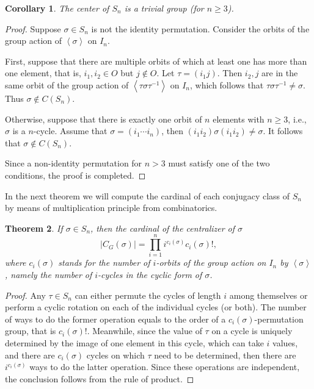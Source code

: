 \documentclass{assignment}[2019/10/15]
\newcommand{\lr}[3]{\left#1#3\right#2}
\theoremstyle{plain}
\newtheorem{theorem}{Theorem}[section]
\newtheorem{corollary}[theorem]{Corollary}
\numberwithin{equation}{section}
\begin{document}
    \begin{corollary}
        The center of $S_n$ is a trivial group (for $n \geq 3$).
    \end{corollary}

    \begin{proof}
        Suppose $\sigma\in S_n$ is not the identity permutation. Consider the orbits of the group action of $\lr<>\sigma$ on $I_n$.

        First, suppose that there are multiple orbits of which at least one has more than one element, that is, $i_1, i_2\in O$ but $j\notin O$. Let $\tau = (i_1 j)$. Then $i_2, j$ are in the same orbit of the group action of $\lr<>{\tau\sigma\tau^{-1}}$ on $I_n$, which follows that $\tau\sigma\tau^{-1}\neq\sigma$. Thus $\sigma\notin C(S_n)$.

        Otherwise, suppose that there is exactly one orbit of $n$ elements with $n\geq 3$, i.e., $\sigma$ is a $n$-cycle. Assume that $\sigma=(i_1\dotsb i_n)$, then $(i_1i_2)\sigma(i_1i_2)\neq \sigma$. It follows that $\sigma\notin C(S_n)$.

        Since a non-identity permutation for $n>3$ must satisfy one of the two conditions, the proof is completed.
    \end{proof}

    In the next theorem we will compute the cardinal of each conjugacy class of $S_n$ by means of multiplication principle from combinatorics.

    \begin{theorem}
        If $\sigma\in S_n$, then the cardinal of the centralizer of $\sigma$
        \begin{equation}
            |C_G(\sigma)| = \prod_{i=1}^ni^{c_i(\sigma)}c_i(\sigma)!,
        \end{equation}
        where $c_i(\sigma)$ stands for the number of $i$-orbits of the group action on $I_n$ by $\lr<>\sigma$, namely the number of $i$-cycles in the cyclic form of $\sigma$.
    \end{theorem}

    \begin{proof}
        Any $\tau\in S_n$ can either permute the cycles of length $i$ among themselves or perform a cyclic rotation on each of the individual cycles (or both). The number of ways to do the former operation equals to the order of a $c_i(\sigma)$-permutation group, that is $c_i(\sigma)!$. Meanwhile, since the value of $\tau$ on a cycle is uniquely determined by the image of one element in this cycle, which can take $i$ values, and there are $c_i(\sigma)$ cycles on which $\tau$ need to be determined, then there are $i^{c_i(\sigma)}$ ways to do the latter operation. Since these operations are independent, the conclusion follows from the rule of product.
    \end{proof}
\end{document}
